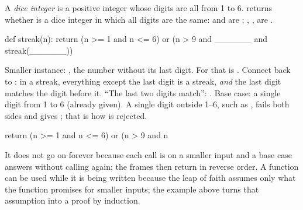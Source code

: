 \documentclass[10pt]{scrartcl}
\begin{document}
\begin{example*}
A \emph{dice integer} is a positive integer whose digits are all from 1 to 6.  returns whether  is a dice integer in which all digits are the same:  and  are ; , ,  are .
\begin{py}
def streak(n):
    return (n >= 1 and n <= 6) or (n > 9 and ______ and streak(______))
\end{py}
\begin{steps}
  \ii Smaller instance: , the number without its last digit. For  that is .
  \ii Connect back to : in a streak, everything except the last digit is a streak, \emph{and} the last digit matches the digit before it.
  \ii ``The last two digits match'': .
  \ii Base case: a single digit from 1 to 6 (already given). A single digit outside 1--6, such as , fails both sides and gives ; that is how  is rejected.
\end{steps}
\begin{py}
    return (n >= 1 and n <= 6) or (n > 9 and n %
\end{py}
\end{example*}
\revisit It does not go on forever because each call is on a smaller input and a base case answers without calling again; the frames then return in reverse order. A function can be used while it is being written because the leap of faith assumes only what the function promises for smaller inputs; the example above turns that assumption into a proof by induction.
\end{document}
